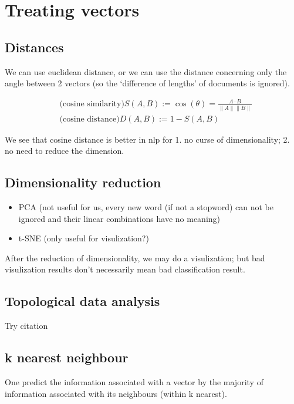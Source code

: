 \documentclass{article}
\begin{document}
\section{Treating vectors}

\subsection{Distances}

We can use euclidean distance, or we can use the distance concerning
only the angle between 2 vectors (so the `difference of lengths' of documents
is ignored).

$$
\begin{aligned}
&\text{(cosine similarity)}S(A, B) :=
\cos (\theta)=\frac{A \cdot B}{\|A\|\|B\|}\\
&\text{(cosine distance)}D(A, B) :=1-S(A, B)
\end{aligned}
$$

We see that cosine distance is better in nlp for 1. no curse of dimensionality; 2. no
need to reduce the dimension.

\subsection{Dimensionality reduction}

\begin{itemize}
  \item PCA (not useful for us, every new word (if not a stopword) can not be ignored and their linear combinations have no meaning)
  \item t-SNE (only useful for visulization?)
\end{itemize}

After the reduction of dimensionality, we may do a visulization; but
bad visulization results don't necessarily mean bad classification result.

\subsection{Topological data analysis}

Try citation \cite{Zhu_2013}

\subsection{k nearest neighbour}

One predict the information associated with a vector by the majority
of information associated with its neighbours (within k nearest).
\end{document}
